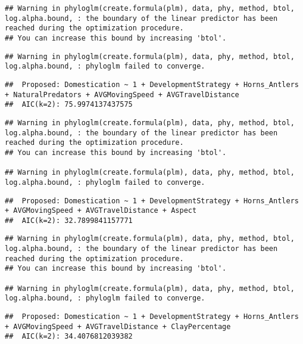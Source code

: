\documentclass[
]{article}
\begin{document}
\begin{verbatim}
## Warning in phyloglm(create.formula(plm), data, phy, method, btol, log.alpha.bound, : the boundary of the linear predictor has been reached during the optimization procedure.
## You can increase this bound by increasing 'btol'.
\end{verbatim}

\begin{verbatim}
## Warning in phyloglm(create.formula(plm), data, phy, method, btol, log.alpha.bound, : phyloglm failed to converge.
\end{verbatim}

\begin{verbatim}
##  Proposed: Domestication ~ 1 + DevelopmentStrategy + Horns_Antlers + NaturalPredators + AVGMovingSpeed + AVGTravelDistance
##  AIC(k=2): 75.9974137437575
\end{verbatim}

\begin{verbatim}
## Warning in phyloglm(create.formula(plm), data, phy, method, btol, log.alpha.bound, : the boundary of the linear predictor has been reached during the optimization procedure.
## You can increase this bound by increasing 'btol'.

## Warning in phyloglm(create.formula(plm), data, phy, method, btol, log.alpha.bound, : phyloglm failed to converge.
\end{verbatim}

\begin{verbatim}
##  Proposed: Domestication ~ 1 + DevelopmentStrategy + Horns_Antlers + AVGMovingSpeed + AVGTravelDistance + Aspect
##  AIC(k=2): 32.7899841157771
\end{verbatim}

\begin{verbatim}
## Warning in phyloglm(create.formula(plm), data, phy, method, btol, log.alpha.bound, : the boundary of the linear predictor has been reached during the optimization procedure.
## You can increase this bound by increasing 'btol'.

## Warning in phyloglm(create.formula(plm), data, phy, method, btol, log.alpha.bound, : phyloglm failed to converge.
\end{verbatim}

\begin{verbatim}
##  Proposed: Domestication ~ 1 + DevelopmentStrategy + Horns_Antlers + AVGMovingSpeed + AVGTravelDistance + ClayPercentage
##  AIC(k=2): 34.4076812039382
\end{verbatim}
\end{document}
